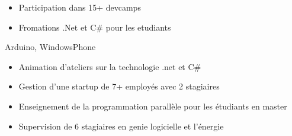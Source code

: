 \documentclass[10pt,a4paper,ragged2e,withhyper]{altacv}
\begin{document}
\begin{paracol}{2}
  \divider

  \begin{itemize}
    \item Participation dans 15+ devcamps
    \item Fromations .Net et C\# pour les etudiants
  \end{itemize}



   { Arduino, WindowsPhone}















  \medskip

  \medskip
  \begin{itemize}
    \item Animation d'ateliers sur la technologie .net et C\#
    \item Gestion d'une startup de 7+ employés avec 2 stagiaires
    \item Enseignement de la programmation parallèle pour les étudiants en master
    \item Supervision de 6 stagiaires en  genie logicielle et l'énergie
  \end{itemize}


\end{paracol}
\end{document}
